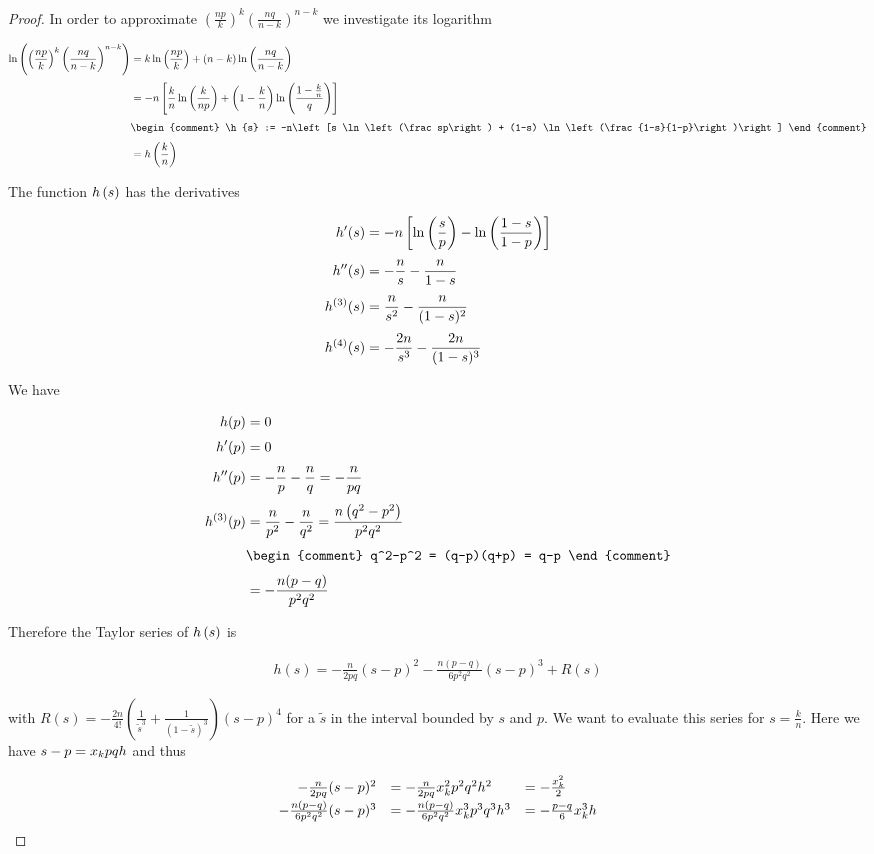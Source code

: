 \begin{proof}
  \noindent In order to approximate $\left(\frac{np}{k}\right)^k \left(\frac{nq}{n-k}\right)^{n-k}$ we investigate its logarithm

  \begin{align}
    \ln\left(\left(\frac{np}{k}\right)^k \left(\frac{nq}{n-k}\right)^{n-k}\right) & = k \ln\left(\frac{np}{k}\right) + (n-k) \ln\left(\frac{nq}{n-k}\right) \nl
    &=-n \left[ \frac kn \ln\left(\frac{k}{np}\right) + \left(1-\frac kn\right) \ln\left(\frac{1-\frac kn}{q}\right)\right] \nl
    &
    \begin{comment}
      \h{s} := -n\left[s \ln\left(\frac sp\right) + (1-s) \ln\left(\frac{1-s}{1-p}\right)\right]
    \end{comment} \nl
    &= \h{\frac kn}
  \end{align}

  \noindent The function $h\left({s}\right)$ has the derivatives

  \begin{align}
    h'(s) &= -n\left[\ln\left(\frac sp\right) - \ln\left(\frac{1-s}{1-p}\right)\right] \nl
    h''(s) &= -\frac ns - \frac n{1-s} \nl
    h^{(3)}(s) &= \frac n{s^2} - \frac n{(1-s)^2} \nl
    h^{(4)}(s) &= -\frac {2n}{s^3} - \frac {2n}{(1-s)^3}
  \end{align}

  \noindent We have

  \begin{align}
    h(p)& = 0 \nl
    h'(p)& =0 \nl
    h''(p) & = -\frac np - \frac nq = -\frac n{pq} \nl
    h^{(3)}(p) &= \frac n{p^2}-\frac{n}{q^2} = \frac{n\left(q^2-p^2\right)}{p^2q^2} \nl
    &
    \begin{comment}
      q^2-p^2 = (q-p)(q+p) = q-p
    \end{comment} \nl
    &= -\frac{n(p-q)}{p^2q^2}
  \end{align}

  \noindent Therefore the Taylor series of $h\left({s}\right)$ is

  \begin{align}
    h(s) = -\frac{n}{2pq} (s-p)^2 - \frac{n(p-q)}{6p^2q^2} (s-p)^3 + R(s)
  \end{align}

  with $R(s)=-\frac{2n}{4!} \left(\frac{1}{\tilde s^3}+\frac{1}{(1-\tilde s)^3}\right) (s-p)^4$ for a $\tilde s$ in the interval bounded by $s$ and $p$. We want to evaluate this series for $s=\frac kn$. Here we have $s-p=x_{k} pqh$ and thus

  \begin{align}
    \begin{array}{rll}
      -\frac{n}{2pq} (s-p)^2 &= -\frac{n}{2pq} \x^2 p^2 q^2 h^2 & = -\frac{\x^2}{2} \nl
      -\frac{n(p-q)}{6p^2q^2} (s-p)^3 &= -\frac{n(p-q)}{6p^2q^2} \x^3p^3q^3h^3 & = -\frac{p-q}{6} \x^3 h
    \end{array}
  \end{align}


\end{proof}
